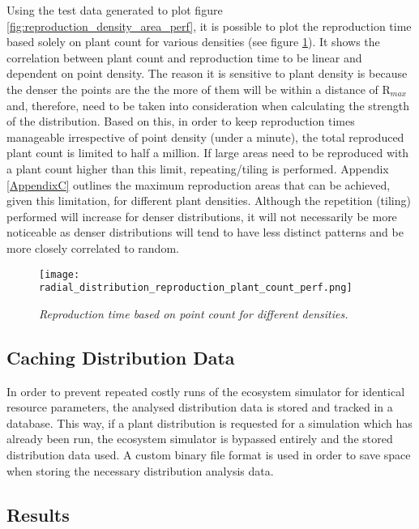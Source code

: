 Using the test data generated to plot figure \ref{fig:reproduction_density_area_perf}, it is possible to plot the reproduction time based solely on plant count for various densities (see figure \ref{fig:reproduction_plant_count_perf}). It shows the correlation between plant count and reproduction time to be linear and dependent on point density. The reason it is sensitive to plant density is because the denser the points are the the more of them will be within a distance of R$_{max}$ and, therefore, need to be taken into consideration when calculating the strength of the distribution. Based on this, in order to keep reproduction times manageable irrespective of point density (under a minute), the total reproduced plant count is limited to half a million. If large areas need to be reproduced with a plant count higher than this limit, repeating/tiling is performed. Appendix \ref{AppendixC} outlines the maximum reproduction areas that can be achieved, given this limitation, for different plant densities. Although the repetition (tiling) performed will increase for denser distributions, it will not necessarily be more noticeable as denser distributions will tend to have less distinct patterns and be more closely correlated to random.\\

\begin{figure}
\center
	\texttt{[image: radial\_distribution\_reproduction\_plant\_count\_perf.png]}
	\caption{ \textit{Reproduction time based on point count for different densities.}}	
	\label{fig:reproduction_plant_count_perf}
\end{figure}

\subsection{Caching Distribution Data}

In order to prevent repeated costly runs of the ecosystem simulator for identical resource parameters, the analysed distribution data is stored and tracked in a database. This way, if a plant distribution is requested for a simulation which has already been run, the ecosystem simulator is bypassed entirely and the stored distribution data used. A custom binary file format is used in order to save space when storing the necessary distribution analysis data.

\subsection{Results} \label{subsec:dist_anal_results}

